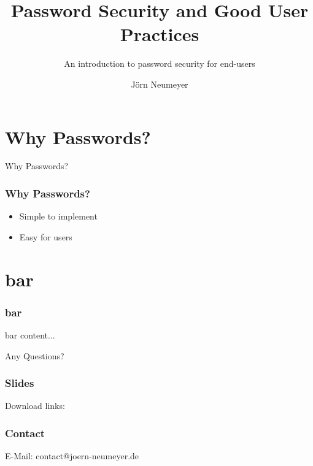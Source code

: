\documentclass{beamer}
\title[Password Security]{Password Security and Good User Practices}
\subtitle{An introduction to password security for end-users}
\author{J\"orn Neumeyer}
\begin{document}
  \frame{\titlepage}
  \section{Why Passwords?}
  \begin{frame}
    \begin{center}
      \Huge Why Passwords?
    \end{center}
  \end{frame}
  \begin{frame}
    \frametitle{Why Passwords?}
    \begin{itemize}
      \item<1-> Simple to implement
      \item<2-> Easy for users
    \end{itemize}
  \end{frame}

  \section{bar}
  \begin{frame}
    \frametitle{bar}
    bar content...
  \end{frame}

  \begin{frame}
    \begin{center}
      \Huge Any Questions?
    \end{center}
  \end{frame}

  \begin{frame}
    \frametitle{Slides}
    \begin{center}
      \Large Download links:\newline
      
    \end{center}
  \end{frame}

  \begin{frame}
    \frametitle{Contact}
    \begin{center}
      \Large E-Mail: contact@joern-neumeyer.de
    \end{center}
  \end{frame}
\end{document}
